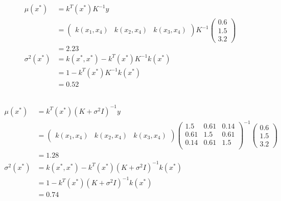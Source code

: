 \documentclass[12pt, a4paper]{article}
\begin{document}
\subsection{}

\begin{align*}
    \mu(x^*)&=k^T(x^*)K^{-1}y\\
    &=\begin{pmatrix}
        k(x_1,x_4)&k(x_2,x_4)&k(x_3,x_4)
    \end{pmatrix} K^{-1}\begin{pmatrix}
        0.6\\ 1.5\\ 3.2
    \end{pmatrix}\\
    &=2.23\\
    \sigma^2(x^*)&=k(x^*,x^*)-k^T(x^*)K^{-1}k(x^*)\\
    &=1-k^T(x^*)K^{-1}k(x^*)\\
    &=0.52
\end{align*}

\subsection{}

\begin{align*}
    \mu(x^*)&=k^T(x^*)(K+\sigma^2I)^{-1}y\\
    &=\begin{pmatrix}
        k(x_1,x_4)&k(x_2,x_4)&k(x_3,x_4)
    \end{pmatrix}
    \begin{pmatrix}
        1.5 & 0.61 & 0.14 \\
        0.61 & 1.5 & 0.61 \\
        0.14 & 0.61 & 1.5\\
    \end{pmatrix}^{-1}
    \begin{pmatrix}
        0.6\\ 1.5\\ 3.2
    \end{pmatrix}\\
    &=1.28\\
    \sigma^2(x^*)&=k(x^*,x^*)-k^T(x^*)(K+\sigma^2I)^{-1}k(x^*)\\
    &=1-k^T(x^*)(K+\sigma^2I)^{-1}k(x^*)\\
    &=0.74
\end{align*}
\end{document}
